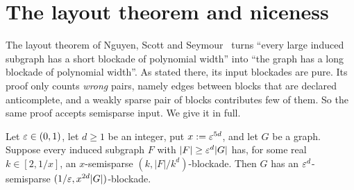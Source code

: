 \section{The layout theorem and niceness}\label{sec:layout}

The layout theorem of Nguyen, Scott and Seymour~\cite[Theorem 6.1]{NSS7} turns ``every large induced
subgraph has a short blockade of polynomial width'' into ``the graph has a long blockade of polynomial
width''. As stated there, its input blockades are pure. Its proof only counts \emph{wrong} pairs,
namely edges between blocks that are declared anticomplete, and a weakly sparse pair of blocks
contributes few of them. So the same proof accepts semisparse input. We give it in full.

\begin{theorem}\label{thm:layout}
Let $\varepsilon\in(0,1)$, let $d\ge1$ be an integer, put $x:=\varepsilon^{5d}$, and let $G$ be a graph. Suppose every
induced subgraph $F$ with $|F|\ge\varepsilon^d|G|$ has, for some real $k\in[2,1/x]$, an $x$-semisparse
$(k,|F|/k^d)$-blockade. Then $G$ has an $\varepsilon^d$-semisparse $(1/\varepsilon,x^{2d}|G|)$-blockade.
\end{theorem}
